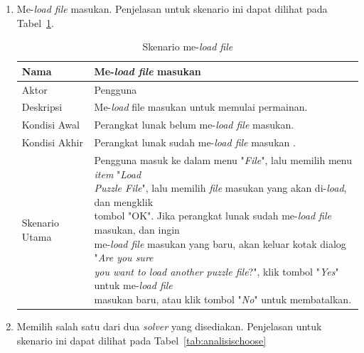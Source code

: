 \begin{enumerate}
\item Me-\textit{load file} masukan. Penjelasan untuk skenario ini dapat dilihat pada Tabel~\ref{tab:analisisload}.

\begin{table}
\centering
\captionsetup{justification=centering}
\begin{tabular}{| l || l |}
\hline
Nama & Me-\textit{load file} masukan \\
\hline
Aktor & Pengguna \\
\hline
Deskripsi & Me-\textit{load} file masukan untuk memulai permainan. \\
\hline
Kondisi Awal & Perangkat lunak belum me-\textit{load file} masukan. \\
\hline
Kondisi Akhir & Perangkat lunak sudah me-\textit{load file} masukan .\\
\hline
Skenario Utama & \makecell[l]{Pengguna masuk ke dalam menu "\textit{File}", lalu memilih menu \textit{item} "\textit{Load} \\ \textit{Puzzle File}", lalu memilih \textit{file} masukan yang akan di-\textit{load}, dan mengklik \\ tombol "OK". Jika perangkat lunak sudah me-\textit{load file} masukan, dan ingin \\ me-\textit{load file} masukan yang baru, akan keluar kotak dialog "\textit{Are you sure} \\  \textit{you want to load another puzzle file}?", klik tombol "\textit{Yes}" untuk me-\textit{load file} \\ masukan baru, atau klik tombol "\textit{No}" untuk membatalkan.} \\
\hline
\end{tabular}
\caption[Skenario me-\textit{load file}]{Skenario me-\textit{load file}}
\label{tab:analisisload}
\end{table}

\item Memilih salah satu dari dua \textit{solver} yang disediakan. Penjelasan untuk skenario ini dapat dilihat pada Tabel~\ref{tab:analisischoose}


\end{enumerate}
